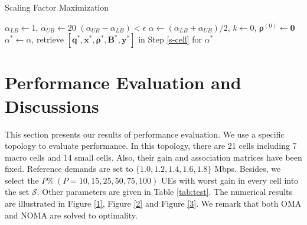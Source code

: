 \documentclass[10pt,journal,final,finalsubmission,twocolumn]{IEEEtran}
\begin{document}
\begin{algorithm}[tbp]\label{al2}
\caption{Scaling Factor Maximization} 
$\alpha_{LB}\leftarrow 1$, $\alpha_{UB}\leftarrow 20$\;
\Repeat 
{$(\alpha _{UB}- \alpha_{LB})<\epsilon$}
{$\alpha \leftarrow (\alpha_{LB}+\alpha_{UB})/{2}$, $k\leftarrow0$, $\boldsymbol{\rho}^{(0)}\leftarrow \boldsymbol{0}$\;
}  
$\alpha^*\leftarrow \alpha$, retrieve $[\boldsymbol{q}^*,\boldsymbol{x}^*,\boldsymbol{\rho}^*, \boldsymbol{B}^*,\boldsymbol{y}^*]$ in Step \ref{s-cell} for $\alpha^*$\;
\;
\end{algorithm} 



\section{Performance Evaluation and Discussions}\label{Sec:PerformanceEvaluationDiscussions}

This section presents our results of performance evaluation. We use a specific topology to evaluate performance. In this topology, there are 21 cells including 7 macro cells and 14 small cells. Also, their gain and association matrices have been fixed. Reference demands are set to $\{1.0, 1.2, 1.4, 1.6, 1.8\}$ Mbps. Besides, we select the $P\%\ (P=10, 15, 25, 50, 75, 100)$ UEs with worst gain in every cell into the set $\mathcal{S}$. Other parameters are given in Table \ref{tab:test}. The numerical results are illustrated in Figure \ref{1}, Figure \ref{2} and Figure \ref{3}. We remark that both OMA and NOMA are solved to optimality.
\end{document}
